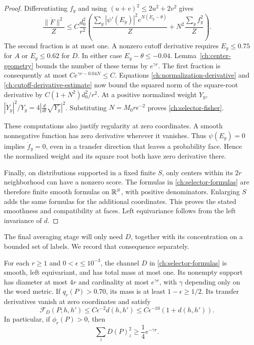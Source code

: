 \begin{proof}
Differentiating $f_y$ and using $(u+v)^2\le2u^2+2v^2$ gives
\begin{equation}
 \frac{\|\dot F\|^2}{Z}
 \le C\frac{d_0^2}{r^2}
 \left(
  \frac{\sum_y|\psi'(E_y)|^2e^{N(E_y-\theta)}}{Z}
   +N^2\frac{\sum_y f_y^2}{Z}
 \right).
 \label{ch:cutoff-derivative-estimate}
\end{equation}
The second fraction is at most one.  A nonzero cutoff derivative requires
$E_y\le0.75$ for $A$ or $E_y\le0.62$ for $D$.  In either case
$E_y-\theta\le-0.04$.  Lemma~\ref{ch:center-geometry} bounds the number
of these terms by $e^{\gamma r}$.  The first fraction is consequently at
most $Ce^{\gamma r-0.04N}\le C$.  Equations
\eqref{ch:normalization-derivative} and
\eqref{ch:cutoff-derivative-estimate} now bound the squared norm of the
square-root derivative by $C(1+N^2)d_0^2/r^2$.  At a positive normalized
weight $Y_y$,
$|\dot Y_y|^2/Y_y=4|\frac{d}{dt}\sqrt{Y_y}|^2$.
Substituting $N=M_0r\epsilon^{-2}$ proves
\eqref{ch:selector-fisher}.

These computations also justify regularity at zero coordinates.  A smooth
nonnegative function has zero derivative wherever it vanishes.  Thus
$\psi(E_y)=0$ implies $\dot f_y=0$, even in a transfer direction that
leaves a probability face.  Hence the normalized weight and its square root
both have zero derivative there.

Finally, on distributions supported in a fixed finite $S$, only centers
within its $2r$ neighborhood can have a nonzero score.  The formulas in
\eqref{ch:selector-formulas} are therefore finite smooth formulas on
$\mathbb R^S$, with positive denominators.  Enlarging $S$ adds the same formulas
for the additional coordinates.  This proves the stated smoothness and
compatibility at faces.  Left equivariance follows from the left invariance
of $d$.
\end{proof}

The final averaging stage will only need $D$, together with its concentration
on a bounded set of labels.  We record that consequence separately.

\begin{lemma}
\label{ch:terminal}
For each $r\ge1$ and $0<\epsilon\le10^{-3}$, the channel $D$ in
\eqref{ch:selector-formulas} is smooth, left equivariant, and has total
mass at most one.  Its nonempty support has diameter at most $4r$ and
cardinality at most $e^{\gamma r}$, with $\gamma$ depending only on the
word metric.  If $q_r(P)>0.70$, its mass is at least
$1-\epsilon\ge1/2$.  Its transfer derivatives vanish at zero coordinates
and satisfy
\[
 \mathcal F_D(P;h,h')\le C\epsilon^{-2}d(h,h')
       \le C\epsilon^{-10}(1+d(h,h')).
\]
In particular, if $\phi_r(P)>0$, then
\begin{equation}
 \sum_zD(P)_z^2\ge\frac14e^{-\gamma r}.
 \label{ch:terminal-square-mass}
\end{equation}
\end{lemma}

